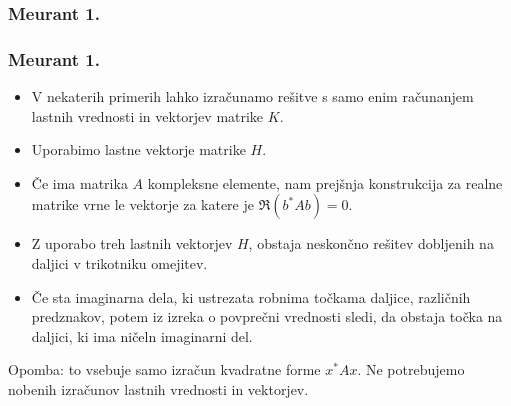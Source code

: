 \documentclass{beamer}
\begin{document}
\subsubsection{Meurant 1.}
\begin{frame}
\frametitle{Meurant 1.}
\begin{itemize}
\item V nekaterih primerih lahko izračunamo rešitve s samo enim ra\-ču\-na\-njem lastnih vrednosti in vektorjev matrike $K$.\pause
\item Uporabimo lastne vektorje matrike $H$.\pause
\item Če ima matrika $A$ kompleksne elemente, nam prejšnja konstrukcija za realne matrike vrne le vektorje za katere je $\Re(b^\ast Ab)=0$.\pause
\item Z uporabo treh lastnih vektorjev $H$, obstaja neskončno rešitev dobljenih na daljici v trikotniku omejitev.\pause
\item  Če sta imaginarna dela, ki ustrezata robnima točkama daljice, različnih predznakov, potem iz izreka o povprečni vrednosti sledi, da obstaja točka na daljici, ki ima ničeln imaginarni del.
\end{itemize}
Opomba: to vsebuje samo izračun kvadratne forme $x^\ast Ax$. Ne potrebujemo nobenih izračunov lastnih vrednosti in vektorjev.
\end{frame}
\end{document}
